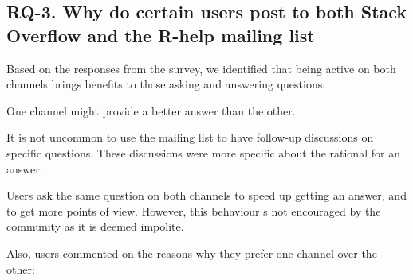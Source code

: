 \subsection{RQ-3. Why do certain users post to both Stack Overflow and the R-help mailing list}

Based on the responses from the survey, we identified that being active on both channels brings benefits to those asking and answering questions:

\begin{description}[itemsep=2pt, topsep=0pt, leftmargin=1em, parsep=0pt]
\item[Find a better answer:] One channel might provide a better answer than the other.
\item[Support follow-up questions:] It is not uncommon to use the mailing list to have follow-up discussions on specific \SO
  questions. These discussions were more specific about the rational for an answer.\\
\item[Speeds up answers:] Users ask the same question on both channels to speed up getting an answer, and to get more points of view. However, this behaviour s not encouraged by the community as it is deemed impolite.\cn
\end{description}

 Also, users commented on the reasons why they prefer one channel over the other:

